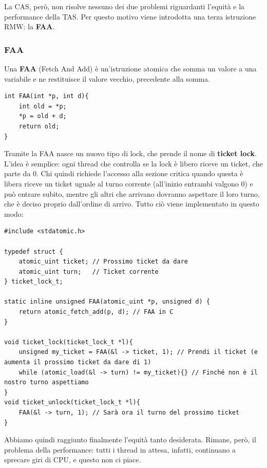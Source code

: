 \documentclass[11pt, a4paper, titlepage, oneside]{scrbook}
\begin{document}
La CAS, però, non risolve nessuno dei due problemi riguardanti l'equità e la performance della TAS. Per questo motivo viene introdotta una terza istruzione RMW: la \textbf{FAA}.

\subsubsection*{FAA}

\begin{Definizione}[FAA]
\label{def-FAA}
Una \textbf{FAA} (Fetch And Add) è un'istruzione atomica che somma un valore a una variabile e ne restituisce il valore vecchio, precedente alla somma.
\end{Definizione}

\begin{lstlisting}[style=C]
int FAA(int *p, int d){
    int old = *p;
    *p = old + d;
    return old;
}
\end{lstlisting}

Tramite la FAA nasce un nuovo tipo di lock, che prende il nome di \textbf{ticket lock}. L'idea è semplice: ogni thread che controlla se la lock è libero riceve un ticket, che parte da 0. Chi quindi richiede l'accesso alla sezione critica quando questa è libera riceve un ticket uguale al turno corrente (all'inizio entrambi valgono 0) e può entrare subito, mentre gli altri che arrivano dovranno aspettare il loro turno, che è deciso proprio dall'ordine di arrivo. Tutto ciò viene implementato in questo modo:
\begin{lstlisting}[style=C]
#include <stdatomic.h>

typedef struct {
    atomic_uint ticket; // Prossimo ticket da dare
    atomic_uint turn;   // Ticket corrente
} ticket_lock_t;

static inline unsigned FAA(atomic_uint *p, unsigned d) {
    return atomic_fetch_add(p, d); // FAA in C
}

void ticket_lock(ticket_lock_t *l){
    unsigned my_ticket = FAA(&l -> ticket, 1); // Prendi il ticket (e aumenta il prossimo ticket da dare di 1)
    while (atomic_load(&l -> turn) != my_ticket){} // Finché non è il nostro turno aspettiamo
}
void ticket_unlock(ticket_lock_t *l){
    FAA(&l -> turn, 1); // Sarà ora il turno del prossimo ticket
}
\end{lstlisting} 

Abbiamo quindi raggiunto finalmente l'equità tanto desiderata. Rimane, però, il problema della performance: tutti i thread in attesa, infatti, continuano a sprecare giri di CPU, e questo non ci piace. 
\end{document}

